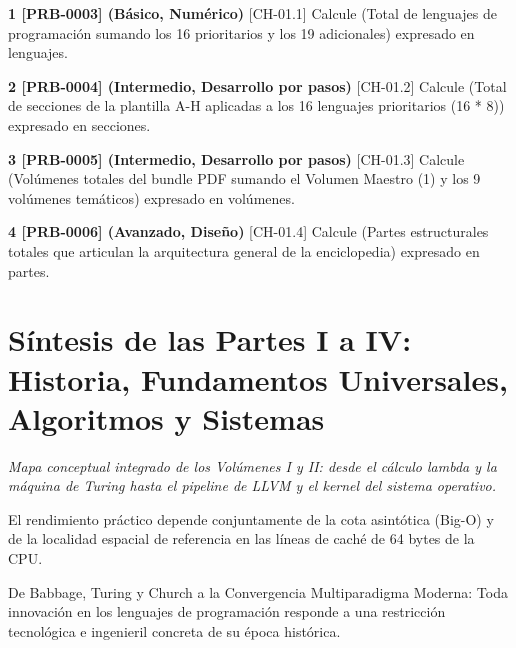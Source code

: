 \documentclass{book}
\begin{document}
\begin{tcolorbox}[title={Ejercicios}, studiumworked, breakable]

\noindent\textbf{1 [PRB-0003] (Básico, Numérico)}
[CH-01.1] Calcule (Total de lenguajes de programación sumando los 16 prioritarios y los 19 adicionales) expresado en lenguajes.

\noindent\textbf{2 [PRB-0004] (Intermedio, Desarrollo por pasos)}
[CH-01.2] Calcule (Total de secciones de la plantilla A-H aplicadas a los 16 lenguajes prioritarios (16 * 8)) expresado en secciones.

\noindent\textbf{3 [PRB-0005] (Intermedio, Desarrollo por pasos)}
[CH-01.3] Calcule (Volúmenes totales del bundle PDF sumando el Volumen Maestro (1) y los 9 volúmenes temáticos) expresado en volúmenes.

\noindent\textbf{4 [PRB-0006] (Avanzado, Diseño)}
[CH-01.4] Calcule (Partes estructurales totales que articulan la arquitectura general de la enciclopedia) expresado en partes.
\end{tcolorbox}

\chapter{Síntesis de las Partes I a IV: Historia, Fundamentos Universales, Algoritmos y Sistemas}
\label{chap:ch-02}

\noindent\textit{Mapa conceptual integrado de los Volúmenes I y II: desde el cálculo lambda y la máquina de Turing hasta el pipeline de LLVM y el kernel del sistema operativo.}

\begin{tcolorbox}[title={Consejo}, studiumtip, breakable]

El rendimiento práctico depende conjuntamente de la cota asintótica (Big-O) y de la localidad espacial de referencia en las líneas de caché de 64 bytes de la CPU.
\end{tcolorbox}

\begin{tcolorbox}[title={Definición}, studiumdef, breakable]

De Babbage, Turing y Church a la Convergencia Multiparadigma Moderna: Toda innovación en los lenguajes de programación responde a una restricción tecnológica e ingenieril concreta de su época histórica.
\end{tcolorbox}
\end{document}
